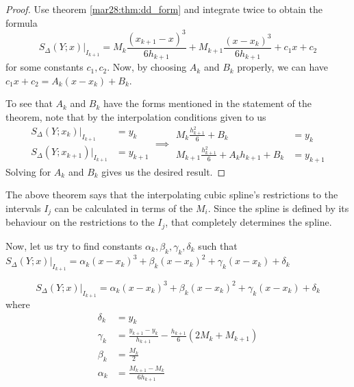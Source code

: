 \begin{proof}
  Use theorem \ref{mar28:thm:dd_form} and integrate twice to obtain the formula
  \[
    S_\Delta(Y ; x) \vert_{I_{k+1}}
    =
    M_k\frac{(x_{k+1} - x)^3}{6h_{k+1}}
    +
    M_{k+1}\frac{(x - x_k)^3}{6h_{k+1}}
    +
    c_1x + c_2
  \]
  for some constants $c_1, c_2$. Now, by choosing $A_k$ and $B_k$ properly, we can have $c_1x + c_2 = A_k(x - x_k) + B_k$.

  To see that $A_k$ and $B_k$ have the forms mentioned in the statement of the theorem, note that by the interpolation conditions given to us
  \[
    \begin{aligned}
      S_\Delta(Y ; x_k) \vert_{I_{k+1}} &= y_k \\
      S_\Delta(Y ; x_{k+1}) \vert_{I_{k+1}} &= y_{k+1}
    \end{aligned}
    \implies
    \begin{aligned}
      M_k \frac{h^2_{k+1}}{6} + B_k &= y_k \\
      M_{k+1} \frac{h^2_{k+1}}{6} + A_kh_{k+1} + B_k &= y_{k+1}
    \end{aligned}
  \]
  Solving for $A_k$ and $B_k$ gives us the desired result.
  \hfill
\end{proof}

\begin{rmk}
  The above theorem says that the interpolating cubic spline's restrictions to the intervals $I_j$ can be calculated in terms of the $M_i$. Since the spline is defined by its behaviour on the restrictions to the $I_j$, that completely determines the spline.
\end{rmk}

Now, let us try to find constants $\alpha_k, \beta_k, \gamma_k, \delta_k$ such that $S_\Delta(Y ; x) \vert_{I_{k+1}} = \alpha_k(x-x_k)^3 + \beta_k(x-x_k)^2 + \gamma_k(x-x_k) + \delta_k$

\begin{thm}
  \label{mar28:thm:taylor}
  \[
    S_\Delta(Y ; x) \vert_{I_{k+1}} = \alpha_k(x-x_k)^3 + \beta_k(x-x_k)^2 + \gamma_k(x-x_k) + \delta_k
  \]
  where
  \begin{align*}
    \delta_k &= y_k \\
    \gamma_k &= \frac{y_{k+1} - y_k}{h_{k+1}} - \frac{h_{k+1}}{6}(2M_k + M_{k+1}) \\
    \beta_k &= \frac{M_k}{2}\\
    \alpha_k &= \frac{M_{k+1} - M_k}{6 h_{k+1}}
  \end{align*}
\end{thm}


